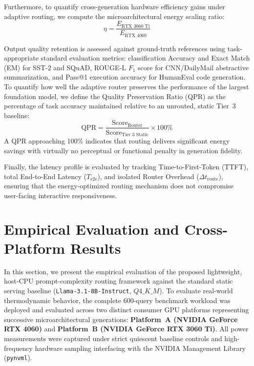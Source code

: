 \documentclass[runningheads]{llncs}
\begin{document}
Furthermore, to quantify cross-generation hardware efficiency gains under adaptive routing, we compute the microarchitectural energy scaling ratio:
\begin{equation}
\eta = \frac{E_{\text{RTX 3060 Ti}}}{E_{\text{RTX 4060}}}
\end{equation}

Output quality retention is assessed against ground-truth references using task-appropriate standard evaluation metrics: classification Accuracy and Exact Match (EM) for SST-2 and SQuAD, ROUGE-L $F_1$ score for CNN/DailyMail abstractive summarization, and Pass@1 execution accuracy for HumanEval code generation. To quantify how well the adaptive router preserves the performance of the largest foundation model, we define the Quality Preservation Ratio (QPR) as the percentage of task accuracy maintained relative to an unrouted, static Tier~3 baseline:
\begin{equation}
\text{QPR} = \frac{\text{Score}_{\text{Router}}}{\text{Score}_{\text{Tier 3 Static}}} \times 100\%
\end{equation}
A QPR approaching 100\% indicates that routing delivers significant energy savings with virtually no perceptual or functional penalty in generation fidelity.

Finally, the latency profile is evaluated by tracking Time-to-First-Token (TTFT), total End-to-End Latency ($T_{\text{e2e}}$), and isolated Router Overhead ($\Delta t_{\text{route}}$), ensuring that the energy-optimized routing mechanism does not compromise user-facing interactive responsiveness.

\FloatBarrier
\vspace{1.5em}


\section{Empirical Evaluation and Cross-Platform Results}
\label{sec:results}
In this section, we present the empirical evaluation of the proposed lightweight, host-CPU prompt-complexity routing framework against the standard static serving baseline (\texttt{Llama-3.1-8B-Instruct}, $Q4\_K\_M$). To evaluate real-world thermodynamic behavior, the complete 600-query benchmark workload was deployed and evaluated across two distinct consumer GPU platforms representing successive microarchitectural generations: \textbf{Platform~A (NVIDIA GeForce RTX 4060)} and \textbf{Platform~B (NVIDIA GeForce RTX 3060 Ti)}.
All power measurements were captured under strict quiescent baseline controls and high-frequency hardware sampling interfacing with the NVIDIA Management Library (\texttt{pynvml}).
\end{document}
